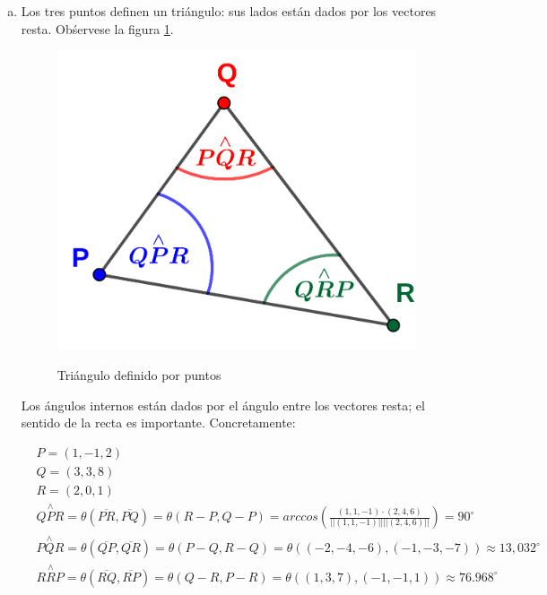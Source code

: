 \documentclass{article}
\begin{document}
\begin{enumerate}[(a)]
\item Los tres puntos definen un triángulo: sus lados están dados por los vectores resta. Obśervese la figura \ref{fig:1-8-a}.

\begin{figure}[ht]
\caption{Triángulo definido por puntos}
\includegraphics[scale=1]{img/ejercicios/1/8-a.png} 
\centering
\label{fig:1-8-a}
\end{figure}

Los ángulos internos están dados por el ángulo entre los vectores resta; el sentido de la recta es importante. Concretamente:

\begin{subequations}
\begin{align}
& P = (1, -1, 2) \\
& Q = (3, 3, 8) \\
& R = (2, 0, 1) \\
& Q\overset{\wedge}{P}R = \theta(\overline{PR}, \overline{PQ}) = \theta(R-P, Q-P) = arccos \left(\frac{(1,1,-1) \cdot (2, 4, 6)}{||(1, 1, -1)|| ||(2,4,6)||} \right) = 90^{\circ} \\
& P\overset{\wedge}{Q}R = \theta(\overline{QP}, \overline{QR}) = \theta(P-Q, R-Q) = \theta((-2,-4,-6),(-1, -3, -7)) \approx 13,032^{\circ} \\
& R\overset{\wedge}{R}P = \theta(\overline{RQ}, \overline{RP}) = \theta(Q-R, P-R) = \theta((1,3,7),(-1, -1, 1)) \approx 76.968^{\circ}
\end{align}
\end{subequations}


\end{enumerate}
\end{document}
